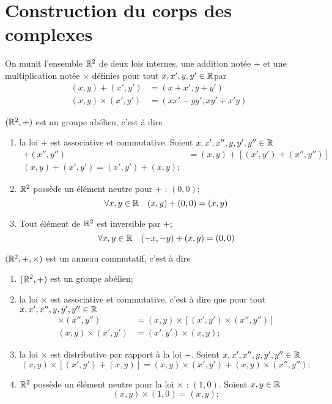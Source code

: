 \chapter{Construction du corps des complexes}

On munit l'ensemble $\mathbb{R}^2$ de deux lois internes, une addition notée $+$ et une multiplication notée $\times$ définies pour tout $x,x',y,y' \in \mathbb{R} $par
\begin{align}
  (x,y)+(x',y') &= (x+x',y+y')\\
  (x,y)\times(x',y') &= (xx'-yy',xy'+x'y)
\end{align}

\begin{prop}
  $(\mathbb{R}^2,+)$ est un groupe abélien, c'est à dire
  \begin{enumerate}
  \item la loi $+$ est associative et commutative. Soient $x,x',x'',y,y',y'' \in \mathbb{R}$
    \begin{align}
      [(x,y)+(x',y')]+(x'',y'')&=(x,y)+[(x',y')+(x'',y'')] \\
      (x,y)+(x',y')=(x',y')+(x,y);
    \end{align}
  \item $\mathbb{R}^2$ possède un élément neutre pour $+$ : $(0,0)$;
    \begin{equation}
      \forall x,y \in \mathbb{R} \quad (x,y)+(0,0)=(x,y)
    \end{equation}
  \item Tout élément de $\mathbb{R}^2$ est inversible par $+$;
    \begin{equation}
      \forall x,y \in \mathbb{R} \quad (-x,-y)+(x,y)=(0,0)
    \end{equation}
  \end{enumerate}
\end{prop}
\begin{prop}
  $(\mathbb{R}^2,+,\times)$ est un anneau commutatif, c'est à dire
  \begin{enumerate}
  \item $(\mathbb{R}^2,+)$ est un groupe abélien;
  \item la loi $\times$ est associative et commutative, c'est à dire que pour tout $x,x',x'',y,y',y'' \in \mathbb{R}$
    \begin{align}
      [(x,y)\times(x',y')]\times (x'',y'')&=(x,y)\times [(x',y')\times (x'',y'')] \\
      (x,y)\times (x',y')&=(x',y')\times (x,y);
    \end{align}
  \item la loi $\times$ est distributive par rapport à la loi $+$. Soient $x,x',x'',y,y',y'' \in \mathbb{R}$ 
    \begin{equation}
      (x,y) \times [(x',y')+(x,y)]= (x,y) \times (x',y') +(x,y) \times (x'',y'');
    \end{equation}
  \item $\mathbb{R}^2$ possède un élément neutre pour la loi $\times$ : $(1,0)$. Soient $x,y \in \mathbb{R}$
    \begin{equation}
      (x,y)\times (1,0)=(x,y);
    \end{equation}
  \end{enumerate}
\end{prop}

